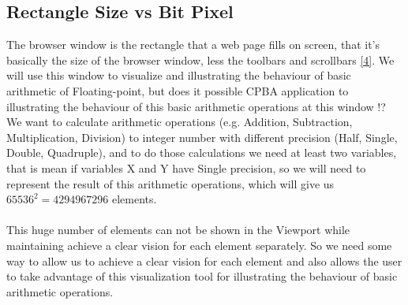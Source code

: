 \documentclass[11pt]{article}
\begin{document}
\subsection{Rectangle Size vs Bit Pixel}%
The browser window is the rectangle that a web page fills on screen, that it’s basically the size of the browser window, less the toolbars and scrollbars \ref{4}. We will use this window to visualize and illustrating the behaviour of basic arithmetic of Floating-point, but does it possible CPBA application to illustrating the behaviour of this basic arithmetic operations at this window !?\\

We want to calculate arithmetic operations (e.g. Addition, Subtraction, Multiplication, Division) to integer number with different precision (Half, Single, Double, Quadruple), and to do those calculations we need at least two variables, that is mean if variables X and Y have Single precision, so we will need to represent the result of this arithmetic operations, which will give us $65536^{2} = 4294967296$ elements.\\\\
This huge number of elements can not be shown in the Viewport while maintaining achieve a clear vision for each element separately. So we need some way to allow us to achieve a clear vision for each element and also allows the user to take advantage of this visualization tool for illustrating the behaviour of basic arithmetic operations.\\
\end{document}
